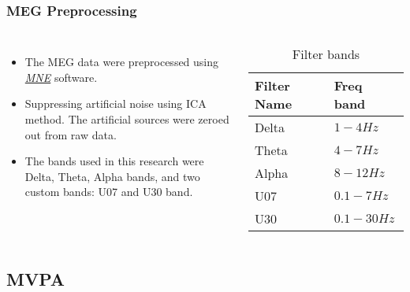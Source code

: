 \documentclass[aspectratio=169]{beamer}
\begin{document}
\begin{frame}
    \frametitle{MEG Preprocessing}

    \begin{columns}

        \begin{itemize}
            \item The MEG data were preprocessed using \hyperlink{https://mne.tools/stable/index.html}{\emph{MNE}} software.
            \item Suppressing artificial noise using ICA method.
                  The artificial sources were zeroed out from raw data.
            \item The bands used in this research were Delta, Theta, Alpha bands, and two custom bands: U07 and U30 band.
        \end{itemize}


        \begin{table}[t]
            \renewcommand{\arraystretch}{1.2}
            \caption{Filter bands}

            \begin{tabular}{|l|l|}
                \hline
                \textbf{Filter Name} & \textbf{Freq band} \\
                \hline
                \hline
                Delta                & $1 - 4 Hz$         \\
                Theta                & $4 - 7 Hz$         \\
                Alpha                & $8 - 12 Hz$        \\
                \hline
                \hline
                U07                  & $0.1 - 7 Hz$       \\
                U30                  & $0.1 - 30 Hz$      \\
                \hline
            \end{tabular}

        \end{table}

    \end{columns}

\end{frame}

\subsection{MVPA}
\end{document}
